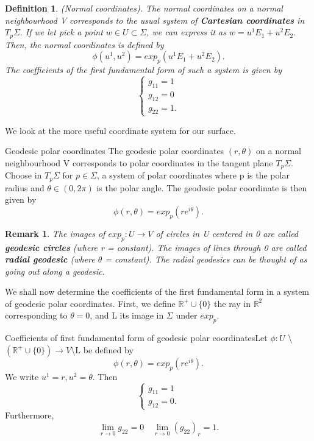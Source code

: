 \documentclass[twoside]{article}
\newtheorem{definition}[theorem]{Definition}
\newtheorem{remark}[theorem]{Remark}
\begin{document}
\begin{definition}(Normal coordinates). The normal coordinates on a normal neighbourhood V corresponds to the usual system of \textbf{Cartesian coordinates} in $T_p\Sigma.$ If we let pick a point $w \in U \subset \Sigma$, we can express it as $w = u^1E_1 + u^2E_2$. Then, the normal coordinates is defined by 
$$
\phi(u^1,u^2) = exp_p(u^1E_1 + u^2E_2).
$$
The coefficients of the first fundamental form of such a system is given by 
$$
\begin{cases}
g_{11} = 1\\ 
g_{12} = 0\\
g_{22} = 1.
\end{cases}
$$
\end{definition}
We look at the more useful coordinate system for our surface.
\begin{definition_exam}{Geodesic polar coordinates}{} The geodesic polar coordinates $(r,\theta)$ on a normal neighbourhood V corresponds to polar coordinates in the tangent plane $T_p\Sigma.$ Choose in $T_p\Sigma$ for $p \in \Sigma$, a system of polar coordinates where p is the polar radius and $\theta \in (0,2\pi)$ is the polar angle. The geodesic polar coordinate is then given by 
$$
\phi(r,\theta) = exp_p(re^{i\theta}).
$$
\end{definition_exam}

\begin{remark}The images of $exp_p: U \rightarrow V$ of circles in U centered in 0 are called \textbf{geodesic circles} (where r = constant). The images of lines through 0 are called \textbf{radial geodesic} (where $\theta$ = constant). The radial geodesics can be thought of as going out along a geodesic.
\end{remark}


We shall now determine the coefficients of the first fundamental form in a system of geodesic polar coordinates. First, we define $\mathbb{R}^+ \cup \{0\}$ the ray in $\mathbb{R}^2$ corresponding to $\theta = 0$, and L its image in $\Sigma$ under $exp_p.$

\begin{proposition_exam}{Coefficients of first fundamental form of geodesic polar coordinates}{}Let $\phi: U$ \textbackslash $(\mathbb{R}^+ \cup \{0\}) \rightarrow V$\textbackslash L be defined by 
$$
\phi(r,\theta) = exp_p(re^{i\theta}).
$$
We write $u^1 = r, u^2 = \theta.$ Then 
$$
\begin{cases}
g_{11} = 1\\
g_{12} = 0.
\end{cases}
$$
Furthermore,
$$
\lim_{r \rightarrow 0}g_{22} = 0 \quad \lim_{r \rightarrow 0}(g_{22})_r = 1.
$$
\end{proposition_exam}
\end{document}
